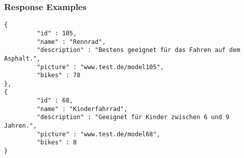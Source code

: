 \subsubsection{Response Examples}\label{response-examples}

\begin{verbatim}
{
         "id" : 105,
         "name" : "Rennrad",
         "description" : "Bestens geeignet für das Fahren auf dem Asphalt.",
         "picture" : "www.test.de/model105",
         "bikes" : 78
},
{
         "id" : 68,
         "name" : "Kinderfahrrad",
         "description" : "Geeignet für Kinder zwischen 6 und 9 Jahren.",
         "picture" : "www.test.de/model68",
         "bikes" : 8
}
\end{verbatim}
